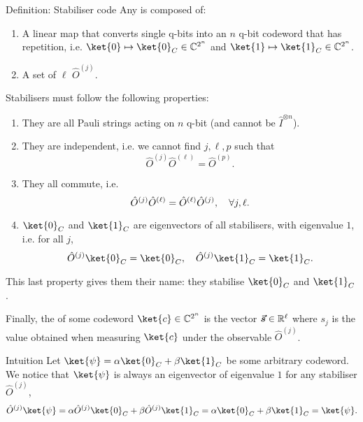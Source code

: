 \documentclass[a4paper]{article}
\begin{document}
\begin{parag}{Definition: Stabiliser code}
    Any  is composed of:
    \begin{enumerate}
        \item A linear map that converts single q-bits into an $n$ q-bit codeword that has repetition, i.e. $\ket{0} \mapsto \ket{0}_C \in \mathbb{C}^{2^n}$ and $\ket{1} \mapsto \ket{1}_C \in \mathbb{C}^{2^n}$.
        \item A set of $\ell $  $\hat{O}^{\left(j\right)}$.
    \end{enumerate}

    Stabilisers must follow the following properties:
    \begin{enumerate}
        \item They are all Pauli strings acting on $n$ q-bit (and cannot be $\hat{I}^{\otimes n}$). 
        \item They are independent, i.e. we cannot find $j, \ell , p$ such that 
        \[\hat{O}^{\left(j\right)} \hat{O}^{\left(\ell \right)} = \hat{O}^{\left(p\right)}.\]
        \item They all commute, i.e. 
        \[\hat{O}^{\left(j\right)} \hat{O}^{\left(\ell \right)} = \hat{O}^{\left(\ell \right)} \hat{O}^{\left(j\right)}, \mathspace \forall j, \ell.\]
        \item $\ket{0}_C$ and $\ket{1}_C$ are eigenvectors of all stabilisers, with eigenvalue $1$, i.e. for all $j$,
        \[\hat{O}^{\left(j\right)} \ket{0}_C = \ket{0}_C, \mathspace \hat{O}^{\left(j\right)} \ket{1}_C = \ket{1}_C.\]
    \end{enumerate}

    This last property gives them their name: they stabilise $\ket{0}_C$ and $\ket{1}_C$.

    Finally, the  of some codeword $\ket{c} \in \mathbb{C}^{2^n}$ is the vector $\bm{\protect\vec{s}} \in \mathbb{R}^\ell$ where $s_j$ is the value obtained when measuring $\ket{c}$ under the observable $\hat{O}^{\left(j\right)}$. 

    \begin{subparag}{Intuition}
        Let $\ket{\psi} = \alpha \ket{0}_C + \beta \ket{1}_C$ be some arbitrary codeword. We notice that $\ket{\psi}$ is always an eigenvector of eigenvalue $1$ for any stabiliser $\hat{O}^{\left(j\right)}$, 
        \[\hat{O}^{\left(j\right)} \ket{\psi} = \alpha \hat{O}^{\left(j\right)} \ket{0}_C + \beta \hat{O}^{\left(j\right)} \ket{1}_C = \alpha \ket{0}_C + \beta \ket{1}_C = \ket{\psi}.\]


\end{subparag}
\end{parag}
\end{document}
